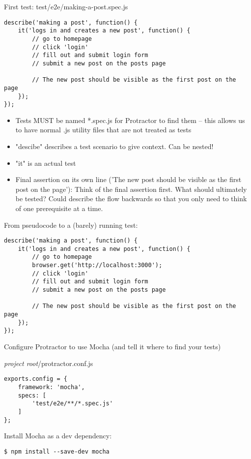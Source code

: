 \documentclass[british]{article}
\begin{document}
First test: test/e2e/making-a-post.spec.js
\begin{lstlisting}
describe('making a post', function() {
    it('logs in and creates a new post', function() {
        // go to homepage
        // click 'login'
        // fill out and submit login form
        // submit a new post on the posts page
        
        // The new post should be visible as the first post on the page
    });
});
\end{lstlisting}

\begin{itemize}
  \item Tests MUST be named *.spec.js for Protractor to find them -- this allows us to have normal .js utility files that are not treated as tests
  \item "descibe" describes a test scenario to give context. Can be nested!
  \item "it" is an actual test
  \item Final assertion on its own line ('The new post should be visible as the first post on the page'): Think of the final assertion first. What should ultimately be tested? Could describe the flow backwards so that you only need to think of one prerequisite at a time.
\end{itemize}

From pseudocode to a (barely) running test:

\begin{lstlisting}
describe('making a post', function() {
    it('logs in and creates a new post', function() {
        // go to homepage
        browser.get('http://localhost:3000');
        // click 'login'
        // fill out and submit login form
        // submit a new post on the posts page
        
        // The new post should be visible as the first post on the page
    });
});
\end{lstlisting}

Configure Protractor to use Mocha (and tell it where to find your tests)

\textit{project root}/protractor.conf.js
\begin{lstlisting}
exports.config = {
    framework: 'mocha',
    specs: [
        'test/e2e/**/*.spec.js'
    ]
};
\end{lstlisting}

Install Mocha as a dev dependency:

\begin{lstlisting}
$ npm install --save-dev mocha
\end{lstlisting}
\end{document}
